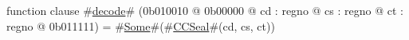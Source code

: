 function clause #\hyperref[zdecode]{decode}# (0b010010 @ 0b00000 @ cd : regno @ cs : regno @ ct : regno @ 0b011111) = #\hyperref[zSome]{Some}#(#\hyperref[zCCSeal]{CCSeal}#(cd, cs, ct))
